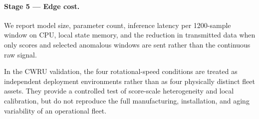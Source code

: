 \documentclass[11pt,a4paper]{article}
\begin{document}
\paragraph{Stage 5 --- Edge cost.}
We report model size, parameter count, inference latency per 1200-sample window on CPU, local
state memory, and the reduction in transmitted data when only scores and selected anomalous
windows are sent rather than the continuous raw signal.

In the CWRU validation, the four rotational-speed conditions are treated as independent
deployment environments rather than as four physically distinct fleet assets. They provide a
controlled test of score-scale heterogeneity and local calibration, but do not reproduce the full
manufacturing, installation, and aging variability of an operational fleet.
\end{document}
